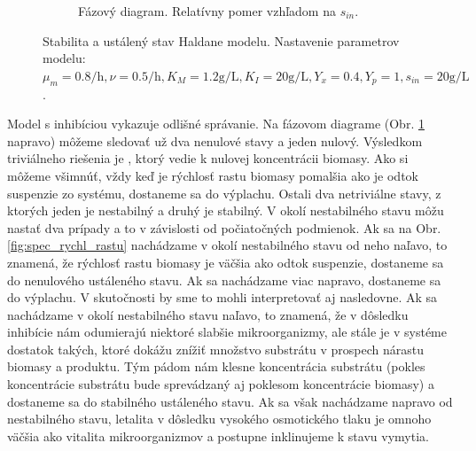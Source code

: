 \begin{figure}
\begin{subfigure}[b]{0.49\textwidth}
		\caption{Fázový diagram. Relatívny pomer vzhľadom na $ s_{in} $.}
		\label{fig:fazovy_haldane}
	\end{subfigure}
	\caption{Stabilita a ustálený stav Haldane modelu. Nastavenie parametrov modelu: $ \mu_{m} = 0.8\si{\per\hour}, \nu = 0.5\si{\per\hour}, K_{M} = 1.2\si{\gram\per\liter}, K_{I} = 20\si{\gram\per\liter}, Y_{x} = 0.4, Y_{p} = 1, s_{in} = 20\si{\gram\per\liter}$.}
	\label{fig:stabilita_haldane}
\end{figure}

Model s inhibíciou vykazuje odlišné správanie. Na fázovom diagrame (Obr. \ref{fig:fazovy_haldane} napravo) môžeme sledovať už dva nenulové stavy a jeden nulový. Výsledkom triviálneho riešenia je , ktorý vedie k nulovej koncentrácii biomasy. Ako si môžeme všimnúť, vždy keď je rýchlosť rastu biomasy pomalšia ako je odtok suspenzie zo systému, dostaneme sa do výplachu. Ostali dva netriviálne stavy, z ktorých jeden je nestabilný a druhý je stabilný. V okolí nestabilného stavu môžu nastať dva prípady a to v závislosti od počiatočných podmienok. Ak sa na Obr. \ref{fig:spec_rychl_rastu} nachádzame v okolí nestabilného stavu od neho
naľavo, to znamená, že rýchlosť rastu biomasy je väčšia ako odtok suspenzie, dostaneme sa do nenulového ustáleného stavu. Ak sa nachádzame viac napravo, dostaneme sa do výplachu. V skutočnosti by sme to mohli interpretovať aj nasledovne. Ak sa nachádzame v okolí nestabilného stavu naľavo, to znamená, že v dôsledku inhibície nám odumierajú niektoré slabšie mikroorganizmy, ale stále je v systéme dostatok takých, ktoré dokážu znížiť množstvo substrátu v prospech nárastu biomasy a produktu. Tým pádom nám klesne koncentrácia substrátu (pokles koncentrácie substrátu bude sprevádzaný aj poklesom koncentrácie biomasy) a dostaneme sa do stabilného ustáleného stavu. Ak sa však nachádzame napravo od nestabilného stavu, letalita v dôsledku vysokého osmotického tlaku je omnoho väčšia ako vitalita mikroorganizmov a postupne inklinujeme k stavu vymytia.

